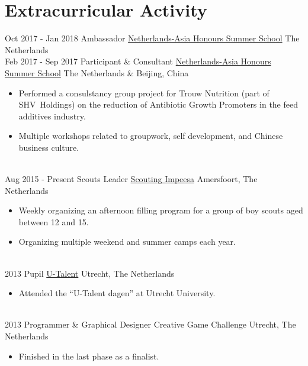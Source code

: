 \documentclass[letterpaper]{twentysecondcv} %
\begin{document}
\section{Extracurricular Activity}
\begin{twenty} %
	\twentyitem
	{Oct 2017 -}
	{Jan 2018}
	{Ambassador}
	{\href{https://nahss.nl}{Netherlands-Asia Honours Summer School}}
	{The Netherlands}
	{}
	\\
	\twentyitem
	{Feb 2017 -}
	{Sep 2017}
	{Participant \& Consultant}
	{\href{https://nahss.nl}{Netherlands-Asia Honours Summer School}}
	{The Netherlands \& Beijing, China}
	{
		\begin{itemize}
			\item Performed a consulstancy group project for Trouw Nutrition (part of SHV~Holdings) on the reduction of Antibiotic Growth Promoters in the feed additives industry.
			\item Multiple workshops related to groupwork, self development, and Chinese business culture.
		\end{itemize}
	}
	\\
	\twentyitem
	{Aug 2015 -}
	{Present}
	{Scouts Leader}
	{\href{http://impeesa.nl/}{Scouting Impeesa}}
	{Amersfoort, The Netherlands}
	{
		\begin{itemize}
			\item Weekly organizing an afternoon filling program for a group of boy scouts aged between 12 and 15.
			\item Organizing multiple weekend and summer camps each year.
		\end{itemize}
	}
	\\
	\twentyitem
	{2013}
	{}
	{Pupil}
	{\href{https://u-talent.nl/}{U-Talent}}
	{Utrecht, The Netherlands}
	{
		\begin{itemize}
			\item Attended the ``U-Talent dagen'' at Utrecht University.
		\end{itemize}
	}
	\\
	\twentyitem
	{2013}
	{}
	{Programmer \& Graphical Designer}
	{Creative Game Challenge}
	{Utrecht, The Netherlands}
	{
		\begin{itemize}
			\item Finished in the last phase as a finalist.
		\end{itemize}
	}
\end{twenty}
\end{document}
